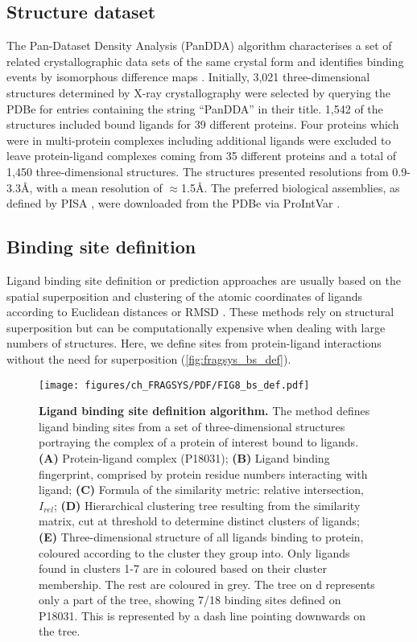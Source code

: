 \subsection{Structure dataset}

The Pan-Dataset Density Analysis (PanDDA) algorithm characterises a set of related crystallographic data sets of the same crystal form and identifies binding events by isomorphous difference maps \cite{PEARCE_2017_PANDDA}.  Initially, 3,021 three-dimensional structures determined by X-ray crystallography were selected by querying the PDBe \cite{wwPDB_2019_PDB} for entries containing the string ``PanDDA'' in their title. 1,542 of the structures included bound ligands for 39 different proteins. Four proteins which were in multi-protein complexes including additional ligands were excluded to leave protein-ligand complexes coming from 35 different proteins and a total of 1,450 three-dimensional structures. The structures presented resolutions from 0.9-3.3\AA{}, with a mean resolution of $\approx$1.5\AA{}. The preferred biological assemblies, as defined by PISA \cite{KRISSINEL_2007_PISA}, were downloaded from the PDBe via ProIntVar \cite{MACGOWAN_2020_DRSASP}. 

\subsection{Binding site definition}

Ligand binding site definition or prediction approaches are usually based on the spatial superposition and clustering of the atomic coordinates of ligands according to Euclidean distances or RMSD \cite{SHIN_2005_PDBLIGAND, KOZAKOV_2005_CLUSTERING, WASS_2010_3DLIGANDSITE, MCGREIG_2022_3DLIGANDSITE}. These methods rely on structural superposition but can be computationally expensive when dealing with large numbers of structures. Here, we define sites from protein-ligand interactions without the need for superposition (\autoref{fig:fragsys_bs_def}).

\begin{figure}[ht!]
    \centering
    \texttt{[image: figures/ch\_FRAGSYS/PDF/FIG8\_bs\_def.pdf]}
    \caption[Ligand binding site definition algorithm]{\textbf{Ligand binding site definition algorithm.} The method defines ligand binding sites from a set of three-dimensional structures portraying the complex of a protein of interest bound to ligands. \textbf{(A)} Protein-ligand complex (P18031); \textbf{(B)} Ligand binding fingerprint, comprised by protein residue numbers interacting with ligand; \textbf{(C)} Formula of the similarity metric: relative intersection, $I_{rel}$; \textbf{(D)} Hierarchical clustering tree resulting from the similarity matrix, cut at threshold to determine distinct clusters of ligands; \textbf{(E)} Three-dimensional structure of all ligands binding to protein, coloured according to the cluster they group into. Only ligands found in clusters 1-7 are in coloured based on their cluster membership. The rest are coloured in grey. The tree on d represents only a part of the tree, showing 7/18 binding sites defined on P18031. This is represented by a dash line pointing downwards on the tree.}
    \label{fig:fragsys_bs_def}
\end{figure}

